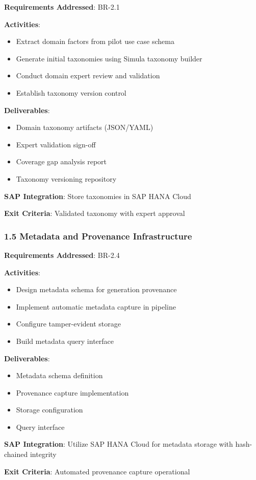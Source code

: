 \documentclass[12pt,a4paper,twoside]{report}
\begin{document}
\begin{tcolorbox}[colback=blue!5,colframe=blue!70,title=1.4 Taxonomy Development]
\textbf{Requirements Addressed}: BR-2.1

\textbf{Activities}:
\begin{itemize}
\item Extract domain factors from pilot use case schema
\item Generate initial taxonomies using Simula taxonomy builder
\item Conduct domain expert review and validation
\item Establish taxonomy version control
\end{itemize}

\textbf{Deliverables}:
\begin{itemize}
\item Domain taxonomy artifacts (JSON/YAML)
\item Expert validation sign-off
\item Coverage gap analysis report
\item Taxonomy versioning repository
\end{itemize}

\textbf{SAP Integration}: Store taxonomies in SAP HANA Cloud

\textbf{Exit Criteria}: Validated taxonomy with expert approval
\end{tcolorbox}

\subsubsection{1.5 Metadata and Provenance Infrastructure}

\begin{tcolorbox}[colback=blue!5,colframe=blue!70,title=1.5 Provenance System]
\textbf{Requirements Addressed}: BR-2.4

\textbf{Activities}:
\begin{itemize}
\item Design metadata schema for generation provenance
\item Implement automatic metadata capture in pipeline
\item Configure tamper-evident storage
\item Build metadata query interface
\end{itemize}

\textbf{Deliverables}:
\begin{itemize}
\item Metadata schema definition
\item Provenance capture implementation
\item Storage configuration
\item Query interface
\end{itemize}

\textbf{SAP Integration}: Utilize SAP HANA Cloud for metadata storage with
hash-chained integrity

\textbf{Exit Criteria}: Automated provenance capture operational
\end{tcolorbox}
\end{document}
